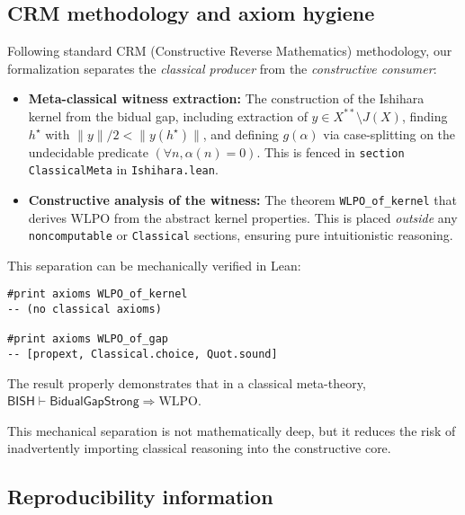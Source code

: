 \documentclass[11pt]{article}
\newcommand{\WLPO}{\mathrm{WLPO}}
\begin{document}
\subsection{CRM methodology and axiom hygiene}\label{sec:crm-hygiene}

Following standard CRM (Constructive Reverse Mathematics) methodology, our formalization 
separates the \emph{classical producer} from the \emph{constructive consumer}:

\begin{itemize}
\item \textbf{Meta-classical witness extraction:} The construction of the Ishihara kernel from the bidual gap,
  including extraction of $y \in X^{**} \setminus J(X)$, finding $h^\star$ with $\|y\|/2 < \|y(h^\star)\|$,
  and defining $g(\alpha)$ via case-splitting on the undecidable predicate $(\forall n, \alpha(n) = 0)$.
  This is fenced in \texttt{section ClassicalMeta} in \texttt{Ishihara.lean}.

\item \textbf{Constructive analysis of the witness:} The theorem \texttt{WLPO\_of\_kernel} that derives $\WLPO$ 
  from the abstract kernel properties. This is placed \emph{outside} any \texttt{noncomputable} or 
  \texttt{Classical} sections, ensuring pure intuitionistic reasoning.
\end{itemize}

This separation can be mechanically verified in Lean:
\begin{lstlisting}[language=Lean,numbers=none]
#print axioms WLPO_of_kernel
-- (no classical axioms)

#print axioms WLPO_of_gap  
-- [propext, Classical.choice, Quot.sound]
\end{lstlisting}

The result properly demonstrates that in a classical meta-theory, 
$\textsf{BISH} \vdash \textsf{BidualGapStrong} \Rightarrow \WLPO$.

This mechanical separation is not mathematically deep, but it reduces the risk of inadvertently importing classical reasoning into the constructive core.

\subsection{Reproducibility information}
\end{document}

